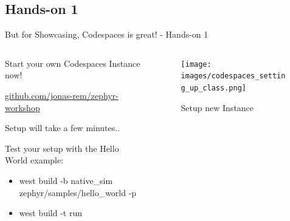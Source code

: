 \documentclass[10pt, aspectratio=169]{beamer}
\begin{document}
\subsection{Hands-on 1}
\begin{frame}[fragile]{But for Showcasing, Codespaces is great! - Hands-on 1}
  \begin{columns}
    \begin{column}{0.6\textwidth}
            Start your own Codespaces Instance now! \footnotemark

      \href{https://github.com/jonas-rem/zephyr-workshop}{github.com/jonas-rem/zephyr-workshop}

      Setup will take a few minutes..

      Test your setup with the Hello World example:
      \begin{itemize}
        \item \scriptsize west build -b native\_sim zephyr/samples/hello\_world -p
        \item \scriptsize west build -t run
      \end{itemize}
    \end{column}
    \begin{column}{0.4\textwidth}
      \begin{figure}
        \texttt{[image: images/codespaces\_setting\_up\_class.png]}
        \caption*{Setup new Instance}
      \end{figure}
    \end{column}
  \end{columns}
\end{frame}
\end{document}
